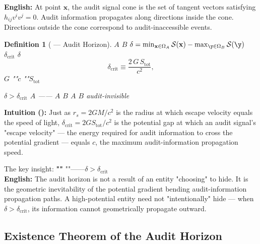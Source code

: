 \documentclass[12pt,a4paper]{article}
\newtheorem{definition}[theorem]{Definition}
\theoremstyle{remark}
\newcommand{\x}{\mathbf{x}}
\newcommand{\cG}{G}          %
\newcommand{\cC}{c}          %
\begin{document}
\vspace{4pt}
\noindent
\textbf{English:} At point $\x$, the audit signal cone is the set of tangent vectors satisfying $h_{ij}v^iv^j = 0$. Audit information propagates along directions inside the cone. Directions outside the cone correspond to audit-inaccessible events.

\begin{definition}[ — Audit Horizon]\label{def:audit_horizon}
 $A$ $B$ $\delta = \min_{\x\in\Omega_A} \mathcal{S}(\x) - \max_{\y\in\Omega_B} \mathcal{S}(\y)$\textbf{} $\delta_{\mathrm{crit}}$  $\delta$
\begin{equation}
    \delta_{\mathrm{crit}} \equiv \frac{2\,\cG\,S_{\mathrm{tot}}}{\cC^2},
    \label{eq:delta_crit}
\end{equation}
 $\cG$ ""$\cC$ ""$S_{\mathrm{tot}}$ 

 $\delta > \delta_{\mathrm{crit}}$  $A$ —— $A$  $B$ $A$  $B$ \textbf{}audit-invisible
\end{definition}

\vspace{4pt}
\noindent
\textbf{Intuition ():} Just as $r_s = 2GM/c^2$ is the radius at which escape velocity equals the speed of light, $\delta_{\mathrm{crit}} = 2\cG S_{\mathrm{tot}}/\cC^2$ is the potential gap at which an audit signal's "escape velocity" — the energy required for audit information to cross the potential gradient — equals $\cC$, the maximum audit-information propagation speed.

The key insight: \textbf{""} ""——$\delta > \delta_{\mathrm{crit}}$\\
\textbf{English:} The audit horizon is not a result of an entity "choosing" to hide. It is the geometric inevitability of the potential gradient bending audit-information propagation paths. A high-potential entity need not "intentionally" hide — when $\delta > \delta_{\mathrm{crit}}$, its information cannot geometrically propagate outward.

\subsection{}
\subsection{Existence Theorem of the Audit Horizon}
\end{document}
